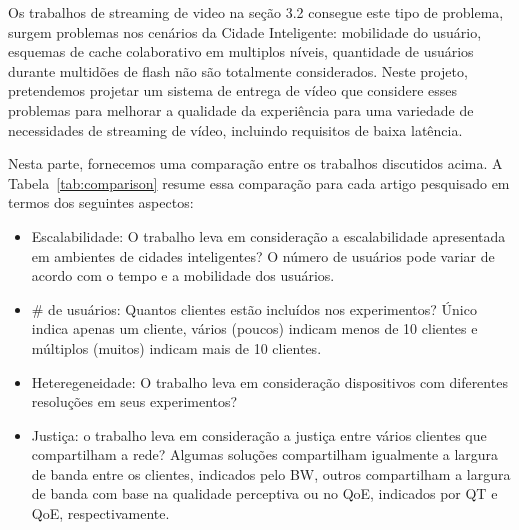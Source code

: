 Os trabalhos de streaming de video na seção 3.2 consegue este tipo de problema, surgem problemas nos cenários da Cidade Inteligente: mobilidade do usuário, esquemas de cache colaborativo em multiplos níveis, quantidade de usuários durante multidões de flash não são totalmente considerados. Neste projeto, pretendemos projetar um sistema de entrega de vídeo que considere esses problemas para melhorar a qualidade da experiência para uma variedade de necessidades de streaming de vídeo, incluindo requisitos de baixa latência.


Nesta parte, fornecemos uma comparação entre os trabalhos discutidos acima.
A Tabela~\ref{tab:comparison} resume essa comparação para cada artigo pesquisado em termos dos seguintes aspectos:

\begin{itemize}

\item Escalabilidade: O trabalho leva em consideração a escalabilidade apresentada em ambientes de cidades inteligentes? O número de usuários pode variar de acordo com o tempo e a mobilidade dos usuários.

\item \# de usuários: Quantos clientes estão incluídos nos experimentos? Único indica apenas um cliente, vários (poucos) indicam menos de 10 clientes e múltiplos (muitos) indicam mais de 10 clientes.

\item Heteregeneidade: O trabalho leva em consideração dispositivos com diferentes resoluções em seus experimentos?

\item Justiça: o trabalho leva em consideração a justiça entre vários clientes que compartilham a rede? Algumas soluções compartilham igualmente a largura de banda entre os clientes, indicados pelo BW, outros compartilham a largura de banda com base na qualidade perceptiva ou no QoE, indicados por QT e QoE, respectivamente.

\end{itemize}


